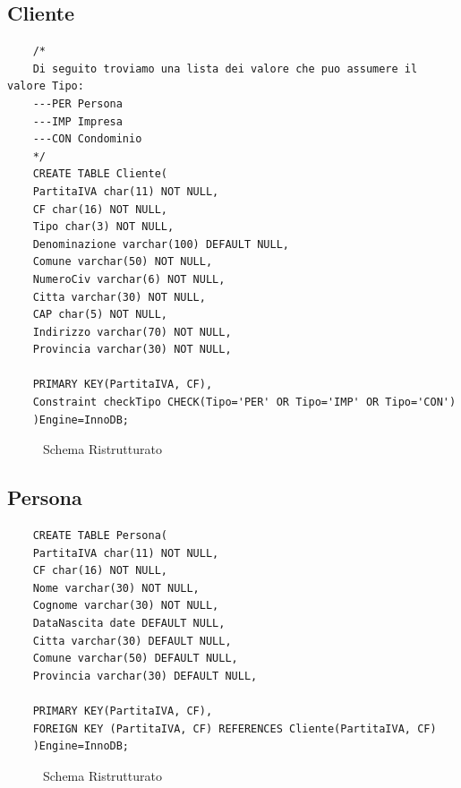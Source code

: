 \documentclass{elegantbook}
\begin{document}
\subsection{Cliente}
\begin{verbatim}
	/*
	Di seguito troviamo una lista dei valore che puo assumere il valore Tipo:
	---PER Persona
	---IMP Impresa
	---CON Condominio
	*/
	CREATE TABLE Cliente(
	PartitaIVA char(11) NOT NULL,
	CF char(16) NOT NULL,
	Tipo char(3) NOT NULL,
	Denominazione varchar(100) DEFAULT NULL,
	Comune varchar(50) NOT NULL,
	NumeroCiv varchar(6) NOT NULL,
	Citta varchar(30) NOT NULL, 
	CAP char(5) NOT NULL,
	Indirizzo varchar(70) NOT NULL,
	Provincia varchar(30) NOT NULL,
	
	PRIMARY KEY(PartitaIVA, CF),
	Constraint checkTipo CHECK(Tipo='PER' OR Tipo='IMP' OR Tipo='CON')
	)Engine=InnoDB;
\end{verbatim}
\begin{figure}[H]
	\centering
	\caption{Schema Ristrutturato}
\end{figure}
\subsection{Persona}
\begin{verbatim}
	CREATE TABLE Persona(
	PartitaIVA char(11) NOT NULL,
	CF char(16) NOT NULL,
	Nome varchar(30) NOT NULL,
	Cognome varchar(30) NOT NULL,
	DataNascita date DEFAULT NULL,
	Citta varchar(30) DEFAULT NULL,
	Comune varchar(50) DEFAULT NULL,
	Provincia varchar(30) DEFAULT NULL,
	
	PRIMARY KEY(PartitaIVA, CF),
	FOREIGN KEY (PartitaIVA, CF) REFERENCES Cliente(PartitaIVA, CF)
	)Engine=InnoDB;
\end{verbatim}
\begin{figure}[H]
	\centering
	\caption{Schema Ristrutturato}
\end{figure}
\end{document}
